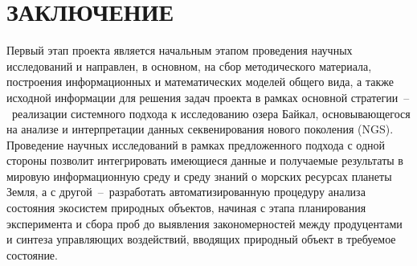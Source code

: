 \documentclass[a4paper,12pt,openany,final]{extreport}
\begin{document}
\chapter*{ЗАКЛЮЧЕНИЕ}
\label{chap:concl}


Первый этап проекта является начальным этапом проведения научных исследований и направлен, в основном, на сбор методического материала, построения информационных и математических моделей общего вида, а также исходной информации для решения задач проекта в рамках основной стратегии~--~реализации системного подхода к исследованию озера Байкал, основывающегося на анализе и интерпретации данных секвенирования нового поколения (NGS).  Проведение научных исследований в рамках предложенного подхода с одной стороны позволит интегрировать имеющиеся данные и получаемые результаты в мировую информационную среду и среду знаний о морских ресурсах планеты Земля, а с другой~--~разработать автоматизированную процедуру анализа состояния экосистем природных объектов, начиная с этапа планирования эксперимента и сбора проб до выявления закономерностей между продуцентами и синтеза управляющих воздействий, вводящих природный объект в требуемое состояние.
\end{document}
